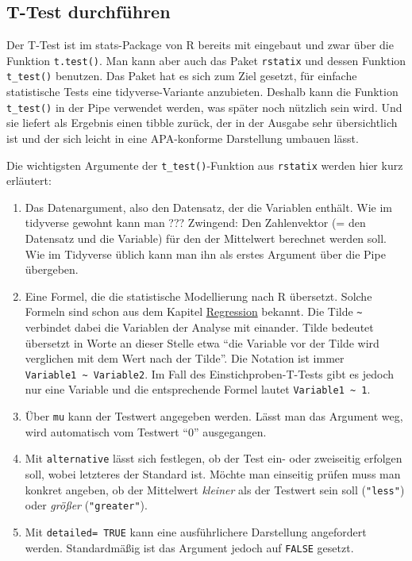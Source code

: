 \documentclass[
]{book}
\begin{document}
\hypertarget{t-test-durchfuxfchren}{%
\subsection{T-Test durchführen}\label{t-test-durchfuxfchren}}

Der T-Test ist im stats-Package von R bereits mit eingebaut und zwar über die Funktion \texttt{t.test()}. Man kann aber auch das Paket \texttt{rstatix} und dessen Funktion \texttt{t\_test()} benutzen. Das Paket hat es sich zum Ziel gesetzt, für einfache statistische Tests eine tidyverse-Variante anzubieten. Deshalb kann die Funktion \texttt{t\_test()} in der Pipe verwendet werden, was später noch nützlich sein wird. Und sie liefert als Ergebnis einen tibble zurück, der in der Ausgabe sehr übersichtlich ist und der sich leicht in eine APA-konforme Darstellung umbauen lässt.

Die wichtigsten Argumente der \texttt{t\_test()}-Funktion aus \texttt{rstatix} werden hier kurz erläutert:

\begin{enumerate}
\def\labelenumi{\arabic{enumi}.}
\item
  Das Datenargument, also den Datensatz, der die Variablen enthält. Wie im tidyverse gewohnt kann man ???
  Zwingend: Den Zahlenvektor (= den Datensatz und die Variable) für den der Mittelwert berechnet werden soll. Wie im Tidyverse üblich kann man ihn als erstes Argument über die Pipe übergeben.
\item
  Eine Formel, die die statistische Modellierung nach R übersetzt. Solche Formeln sind schon aus dem Kapitel \protect\hyperlink{regression}{Regression} bekannt. Die Tilde \texttt{\textasciitilde{}} verbindet dabei die Variablen der Analyse mit einander. Tilde bedeutet übersetzt in Worte an dieser Stelle etwa ``die Variable vor der Tilde wird verglichen mit dem Wert nach der Tilde''. Die Notation ist immer \texttt{Variable1\ \textasciitilde{}\ Variable2}. Im Fall des Einstichproben-T-Tests gibt es jedoch nur eine Variable und die entsprechende Formel lautet \texttt{Variable1\ \textasciitilde{}\ 1}.
\item
  Über \texttt{mu} kann der Testwert angegeben werden. Lässt man das Argument weg, wird automatisch vom Testwert ``0'' ausgegangen.
\item
  Mit \texttt{alternative} lässt sich festlegen, ob der Test ein- oder zweiseitig erfolgen soll, wobei letzteres der Standard ist. Möchte man einseitig prüfen muss man konkret angeben, ob der Mittelwert \emph{kleiner} als der Testwert sein soll (\texttt{"less"}) oder \emph{größer} (\texttt{"greater"}).
\item
  Mit \texttt{detailed=\ TRUE} kann eine ausführlichere Darstellung angefordert werden. Standardmäßig ist das Argument jedoch auf \texttt{FALSE} gesetzt.
\end{enumerate}
\end{document}
